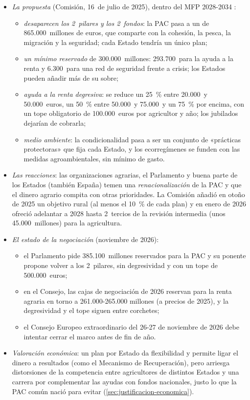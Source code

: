 \documentclass[11pt]{article}
\begin{document}
\begin{itemize}
\item \emph{La propuesta} (Comisión, 16~de julio de 2025), dentro del MFP 2028-2034 \nocite{CE2025PACpost2027,CE2025ReglamentoPAC}:
  \begin{itemize}
  \item \emph{desaparecen los 2~pilares y los 2~fondos}: la PAC pasa a un  de 865.000~millones de euros, que comparte con la cohesión, la pesca, la migración y la seguridad; cada Estado tendría un único plan;
  \item \emph{un mínimo reservado} de 300.000~millones: 293.700~para la ayuda a la renta y 6.300~para una red de seguridad frente a crisis; los Estados pueden añadir más de su sobre;
  \item \emph{ayuda a la renta degresiva}: se reduce un 25~\% entre 20.000~y 50.000~euros, un 50~\% entre 50.000~y 75.000~y un 75~\% por encima, con un tope obligatorio de 100.000~euros por agricultor y año; los jubilados dejarían de cobrarla;
  \item \emph{medio ambiente}: la condicionalidad pasa a ser un conjunto de «prácticas protectoras» que fija cada Estado, y los ecorregímenes se funden con las medidas agroambientales, sin mínimo de gasto.
  \end{itemize}
\item \emph{Las reacciones}: las organizaciones agrarias, el Parlamento y buena parte de los Estados (también España) temen una \emph{renacionalización} de la PAC y que el dinero agrario compita con otras prioridades. La Comisión añadió en otoño de 2025 un objetivo rural (al menos el 10~\% de cada plan) y en enero de 2026 ofreció adelantar a 2028 hasta 2~tercios de la revisión intermedia (unos 45.000~millones) para la agricultura\nocite{Consejo2026ST5422}.
\item \emph{El estado de la negociación} (noviembre de 2026)\nocite{EPRS2026MFP}:
  \begin{itemize}
  \item el Parlamento pide 385.100~millones reservados para la PAC y su ponente propone volver a los 2~pilares, sin degresividad y con un tope de 500.000~euros;
  \item en el Consejo, las cajas de negociación de 2026 reservan para la renta agraria en torno a 261.000-265.000 millones (a precios de 2025), y la degresividad y el tope siguen entre corchetes;
  \item el Consejo Europeo extraordinario del 26-27 de noviembre de 2026 debe intentar cerrar el marco antes de fin de año.
  \end{itemize}
\item \emph{Valoración económica}: un plan por Estado da flexibilidad y permite ligar el dinero a resultados (como el Mecanismo de Recuperación), pero arriesga distorsiones de la competencia entre agricultores de distintos Estados y una carrera por complementar las ayudas con fondos nacionales, justo lo que la PAC común nació para evitar (\ref{sec:justificacion-economica}).
\end{itemize}
\end{document}
